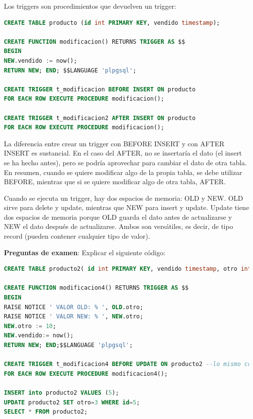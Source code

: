 Los triggers son procedimientos que devuelven un trigger:
\begin{lstlisting}[language=SQL]
CREATE TABLE producto (id int PRIMARY KEY, vendido timestamp);

CREATE FUNCTION modificacion() RETURNS TRIGGER AS $$
BEGIN
NEW.vendido := now();
RETURN NEW; END; $$LANGUAGE 'plpgsql';

CREATE TRIGGER t_modificacion BEFORE INSERT ON producto 
FOR EACH ROW EXECUTE PROCEDURE modificacion();

CREATE TRIGGER t_modificacion2 AFTER INSERT ON producto 
FOR EACH ROW EXECUTE PROCEDURE modificacion();
\end{lstlisting}
La diferencia entre crear un trigger con BEFORE INSERT y con AFTER INSERT es sustancial. En el caso del AFTER, no se insertaría el dato (el insert se ha hecho antes), pero se podría aprovechar para cambiar el dato de otra tabla. En resumen, cuando se quiere modificar algo de la propia tabla, se debe utilizar BEFORE, mientras que si se quiere modificar algo de otra tabla, AFTER. 

Cuando se ejecuta un trigger, hay dos espacios de memoria: OLD y NEW. OLD sirve para delete y update, mientras que NEW para insert y update. Update tiene dos espacios de memoria porque OLD guarda el dato antes de actualizarse y NEW el dato después de actualizarse. Ambos son versátiles, es decir, de tipo record (pueden contener cualquier tipo de valor).

\textbf{Preguntas de examen}: Explicar el siguiente código:
\begin{lstlisting}[language = SQL]
CREATE TABLE producto2( id int PRIMARY KEY, vendido timestamp, otro int);

CREATE FUNCTION modificacion4() RETURNS TRIGGER AS $$
BEGIN
RAISE NOTICE ' VALOR OLD: % ', OLD.otro;
RAISE NOTICE ' VALOR NEW: % ', NEW.otro;
NEW.otro := 10;
NEW.vendido:= now();
RETURN NEW; END;$$LANGUAGE 'plpgsql';

CREATE TRIGGER t_modificacion4 BEFORE UPDATE ON producto2 --lo mismo con AFTER UPDATE
FOR EACH ROW EXECUTE PROCEDURE modificacion4();

INSERT into producto2 VALUES (5);
UPDATE producto2 SET otro=3 WHERE id=5;
SELECT * FROM producto2;
\end{lstlisting}